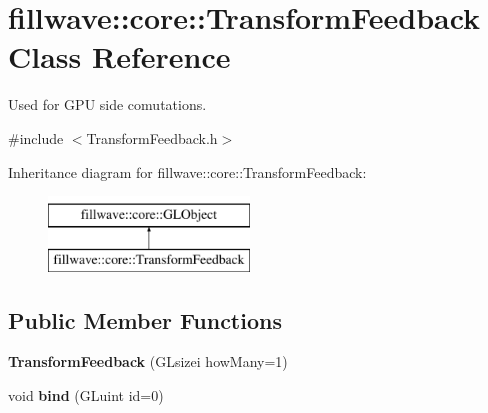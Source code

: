 \hypertarget{classfillwave_1_1core_1_1TransformFeedback}{}\section{fillwave\+:\+:core\+:\+:Transform\+Feedback Class Reference}
\label{classfillwave_1_1core_1_1TransformFeedback}


Used for G\+P\+U side comutations.  




{\ttfamily \#include $<$Transform\+Feedback.\+h$>$}

Inheritance diagram for fillwave\+:\+:core\+:\+:Transform\+Feedback\+:\begin{figure}[H]
\begin{center}
\leavevmode
\includegraphics[height=2.000000cm]{classfillwave_1_1core_1_1TransformFeedback}
\end{center}
\end{figure}
\subsection*{Public Member Functions}
\begin{DoxyCompactItemize}
\item 
\hypertarget{classfillwave_1_1core_1_1TransformFeedback_a327ae269511188c24f1144f5f65795d5}{}{\bfseries Transform\+Feedback} (G\+Lsizei how\+Many=1)\label{classfillwave_1_1core_1_1TransformFeedback_a327ae269511188c24f1144f5f65795d5}

\item 
\hypertarget{classfillwave_1_1core_1_1TransformFeedback_afa458e0e335462e0dd3d88f0271f3830}{}void {\bfseries bind} (G\+Luint id=0)\label{classfillwave_1_1core_1_1TransformFeedback_afa458e0e335462e0dd3d88f0271f3830}

\end{DoxyCompactItemize}
